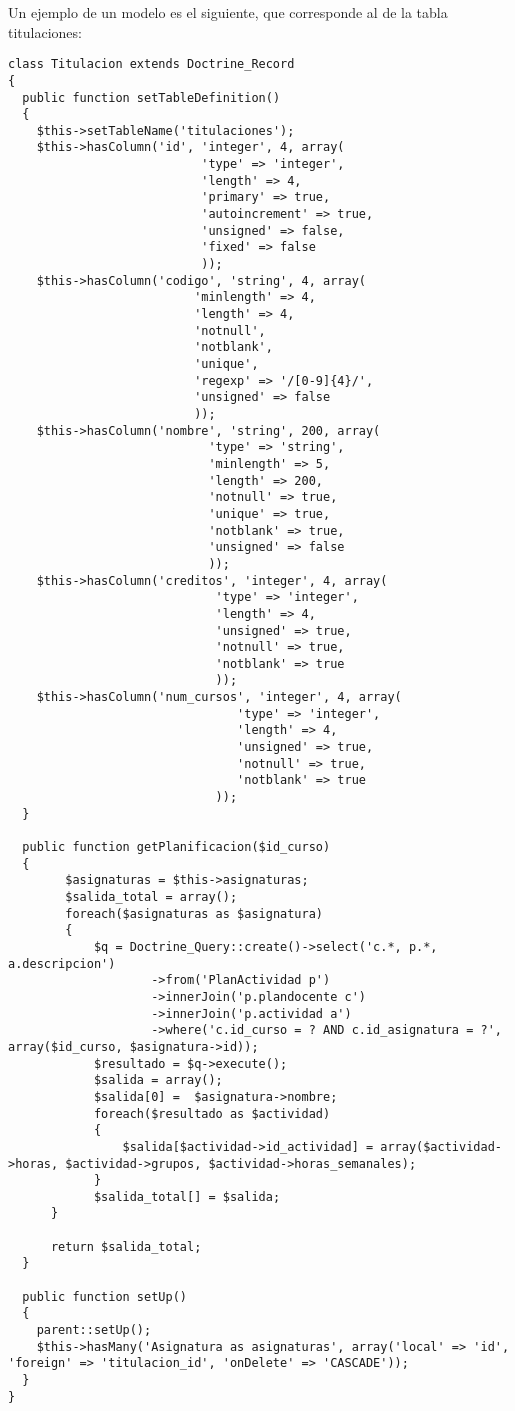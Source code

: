 Un ejemplo de un modelo es el siguiente, que corresponde al de la tabla titulaciones:

\begin{lstlisting}[style=PHP]
class Titulacion extends Doctrine_Record
{
  public function setTableDefinition()
  {
    $this->setTableName('titulaciones');
    $this->hasColumn('id', 'integer', 4, array(
					       'type' => 'integer',
					       'length' => 4,
					       'primary' => true,
					       'autoincrement' => true,
					       'unsigned' => false,
					       'fixed' => false
					       ));
    $this->hasColumn('codigo', 'string', 4, array(
    					  'minlength' => 4,	
						  'length' => 4,
						  'notnull',
						  'notblank',						  
						  'unique',
						  'regexp' => '/[0-9]{4}/',
						  'unsigned' => false
						  ));
    $this->hasColumn('nombre', 'string', 200, array(
						    'type' => 'string',
						    'minlength' => 5,
						    'length' => 200,
						    'notnull' => true,
						    'unique' => true,
						    'notblank' => true,
						    'unsigned' => false
						    ));
    $this->hasColumn('creditos', 'integer', 4, array(
						     'type' => 'integer',
						     'length' => 4,
						     'unsigned' => true,
						     'notnull' => true,
						     'notblank' => true
						     ));
    $this->hasColumn('num_cursos', 'integer', 4, array(
                                'type' => 'integer',
                                'length' => 4,
                                'unsigned' => true,
                                'notnull' => true,
                                'notblank' => true
                             ));
  }

  public function getPlanificacion($id_curso)
  {
        $asignaturas = $this->asignaturas;
        $salida_total = array();
        foreach($asignaturas as $asignatura)
        {
            $q = Doctrine_Query::create()->select('c.*, p.*, a.descripcion')
                    ->from('PlanActividad p')
                    ->innerJoin('p.plandocente c')
                    ->innerJoin('p.actividad a')
                    ->where('c.id_curso = ? AND c.id_asignatura = ?', array($id_curso, $asignatura->id));
            $resultado = $q->execute();
            $salida = array();
            $salida[0] =  $asignatura->nombre;
            foreach($resultado as $actividad)
            {
                $salida[$actividad->id_actividad] = array($actividad->horas, $actividad->grupos, $actividad->horas_semanales);
            }
            $salida_total[] = $salida;
      }
      
      return $salida_total;
  }
  
  public function setUp()
  {
    parent::setUp();
    $this->hasMany('Asignatura as asignaturas', array('local' => 'id', 'foreign' => 'titulacion_id', 'onDelete' => 'CASCADE'));
  }
}
\end{lstlisting}

